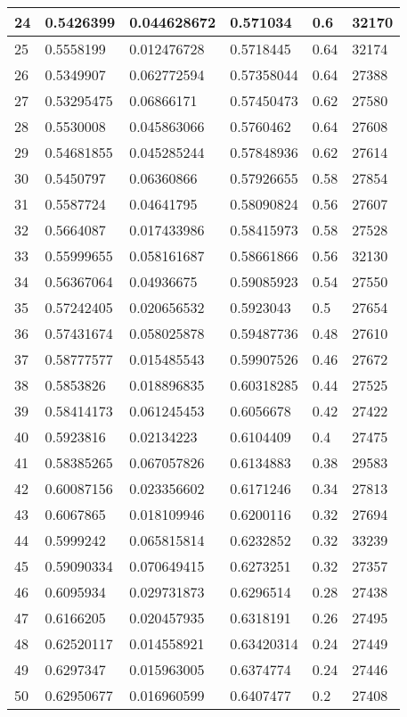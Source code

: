 \begin{longtable}{|l|l|l|l|l|l|}
24 & 0.5426399 & 0.044628672 & 0.571034 & 0.6 & 32170 \\ \hline 
25 & 0.5558199 & 0.012476728 & 0.5718445 & 0.64 & 32174 \\ \hline 
26 & 0.5349907 & 0.062772594 & 0.57358044 & 0.64 & 27388 \\ \hline 
27 & 0.53295475 & 0.06866171 & 0.57450473 & 0.62 & 27580 \\ \hline 
28 & 0.5530008 & 0.045863066 & 0.5760462 & 0.64 & 27608 \\ \hline 
29 & 0.54681855 & 0.045285244 & 0.57848936 & 0.62 & 27614 \\ \hline 
30 & 0.5450797 & 0.06360866 & 0.57926655 & 0.58 & 27854 \\ \hline 
31 & 0.5587724 & 0.04641795 & 0.58090824 & 0.56 & 27607 \\ \hline 
32 & 0.5664087 & 0.017433986 & 0.58415973 & 0.58 & 27528 \\ \hline 
33 & 0.55999655 & 0.058161687 & 0.58661866 & 0.56 & 32130 \\ \hline 
34 & 0.56367064 & 0.04936675 & 0.59085923 & 0.54 & 27550 \\ \hline 
35 & 0.57242405 & 0.020656532 & 0.5923043 & 0.5 & 27654 \\ \hline 
36 & 0.57431674 & 0.058025878 & 0.59487736 & 0.48 & 27610 \\ \hline 
37 & 0.58777577 & 0.015485543 & 0.59907526 & 0.46 & 27672 \\ \hline 
38 & 0.5853826 & 0.018896835 & 0.60318285 & 0.44 & 27525 \\ \hline 
39 & 0.58414173 & 0.061245453 & 0.6056678 & 0.42 & 27422 \\ \hline 
40 & 0.5923816 & 0.02134223 & 0.6104409 & 0.4 & 27475 \\ \hline 
41 & 0.58385265 & 0.067057826 & 0.6134883 & 0.38 & 29583 \\ \hline 
42 & 0.60087156 & 0.023356602 & 0.6171246 & 0.34 & 27813 \\ \hline 
43 & 0.6067865 & 0.018109946 & 0.6200116 & 0.32 & 27694 \\ \hline 
44 & 0.5999242 & 0.065815814 & 0.6232852 & 0.32 & 33239 \\ \hline 
45 & 0.59090334 & 0.070649415 & 0.6273251 & 0.32 & 27357 \\ \hline 
46 & 0.6095934 & 0.029731873 & 0.6296514 & 0.28 & 27438 \\ \hline 
47 & 0.6166205 & 0.020457935 & 0.6318191 & 0.26 & 27495 \\ \hline 
48 & 0.62520117 & 0.014558921 & 0.63420314 & 0.24 & 27449 \\ \hline 
49 & 0.6297347 & 0.015963005 & 0.6374774 & 0.24 & 27446 \\ \hline 
50 & 0.62950677 & 0.016960599 & 0.6407477 & 0.2 & 27408 \\ \hline 
\end{longtable}
